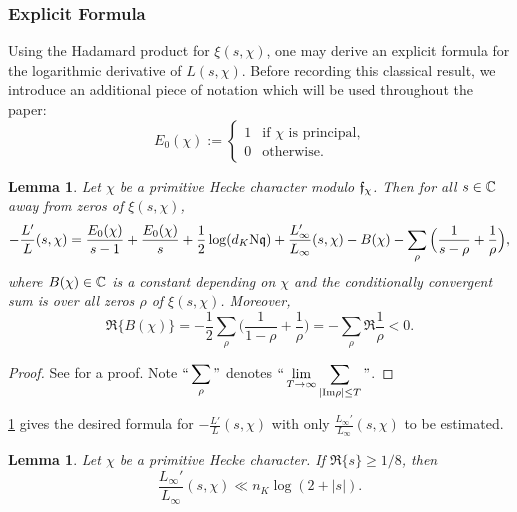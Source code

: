\documentclass[12pt,psamsfonts]{amsart}
\newtheorem{lem}[thm]{Lemma}
\theoremstyle{definition}
\theoremstyle{remark}
\numberwithin{equation}{section}
\newcounter{notation}
\begin{document}
\subsubsection*{Explicit Formula} 
Using the Hadamard product for $\xi(s,\chi)$, one may derive an explicit formula for the logarithmic derivative of $L(s,\chi)$. Before recording this classical result, we introduce an additional piece of notation which will be used throughout the paper: 
\begin{equation}
E_0(\chi) := \begin{cases} 1 & \text{if $\chi$ is principal,} \\ 0 & \text{otherwise.} \end{cases}
\label{def:E_0}
\end{equation}
\begin{lem}
\label{LogDiffCorollary}
Let $\chi$ be a primitive Hecke character modulo $\mathfrak{f}_{\chi}$. Then for all $s \in \mathbb{C}$ away from zeros of $\xi(s,\chi)$, 
\[
-\frac{L'}{L}(s,\chi) =  \frac{E_0(\chi)}{s-1} + \frac{E_0(\chi)}{s} + \frac{1}{2} \log (d_K \mathrm{N}\mathfrak{q}) + \frac{L_{\infty}'}{L_{\infty}}(s, \chi)  - B(\chi) - \sum_{\rho} \Big(\frac{1}{s-\rho} + \frac{1}{\rho} \Big),
\]
where $B(\chi) \in \mathbb{C}$ is a constant depending on $\chi$ and the conditionally convergent sum is over all zeros $\rho$ of $\xi(s,\chi)$. Moreover, 
\[
\Re\{ B(\chi) \}= -\frac{1}{2}  \sum_{\rho} \Big(\frac{1}{1-\rho} + \frac{1}{\rho} \Big) = -\sum_{\rho} \Re \frac{1}{\rho} < 0.
\label{BChi}
\]
\end{lem}
\begin{proof} See \cite[Section 5]{LO} for a proof. Note $\displaystyle ``\sum_{\rho}"$ denotes $``\displaystyle \lim_{T \rightarrow \infty} \sum_{|\mathrm{Im} \rho| \leq T}"$. 
\end{proof}
\noindent
\cref{LogDiffCorollary}  gives the desired formula for $-\frac{L'}{L}(s,\chi)$ with only $\frac{L_{\infty}'}{L_{\infty}}(s,\chi)$ to be estimated.
\begin{lem} \label{LogDiff-Infinite} Let $\chi$ be a primitive Hecke character.  If $\Re\{s\} \geq 1/8$, then
\[
\frac{L_{\infty}'}{L_{\infty}}(s,\chi) \ll n_K \log(2 + |s|). 
\]
\end{lem}
\end{document}

